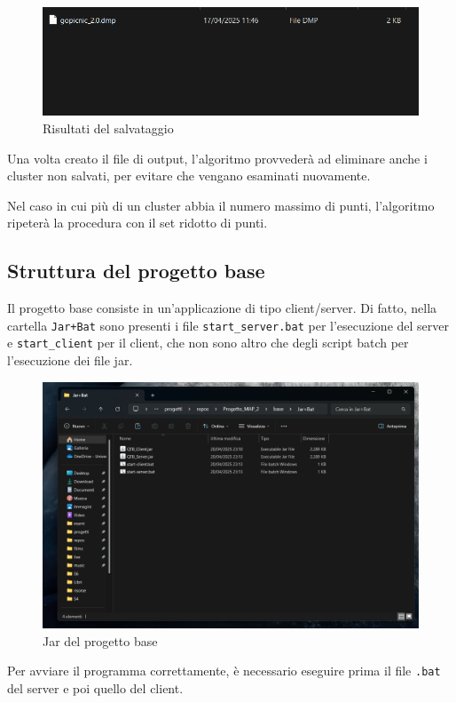 \begin{figure}[h!]
    \centering
    \includegraphics[width = 0.7 \textwidth]{images/results.png}
    \caption{Risultati del salvataggio}
    
\end{figure}

Una volta creato il file di output, l'algoritmo provvederà ad eliminare anche i cluster non salvati, per evitare che vengano esaminati nuovamente. 

Nel caso in cui più di un cluster abbia il numero massimo di punti, l'algoritmo ripeterà la procedura con il set ridotto di punti. 

\subsection{Struttura del progetto base}

Il progetto base consiste in un'applicazione di tipo client/server. Di fatto, nella cartella \texttt{Jar+Bat} sono presenti i file \texttt{start\_server.bat} per l'esecuzione del server e \texttt{start\_client} per il client, che non sono altro che degli script batch per l'esecuzione dei file jar.

\begin{figure}[h!]
    \centering
    \includegraphics[width = 0.7 \textwidth]{images/file jar base.png}
    \caption{Jar del progetto base}
\end{figure}


\begin{tcolorbox}[  colback=white!5!white, colframe=gray, title={Avvertenza} ]

    Per avviare il programma correttamente, è necessario eseguire prima il file \texttt{.bat} del server e poi quello del client.
\end{tcolorbox}

